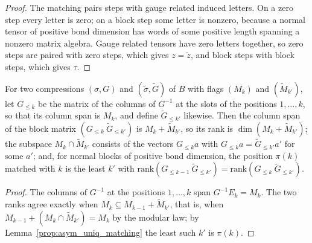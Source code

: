 \begin{proof}
    \leanok
    The matching pairs steps with gauge related induced letters. On a zero step every letter is
    zero; on a block step some letter is nonzero, because a normal tensor of positive bond
    dimension has words of some positive length spanning a nonzero matrix algebra. Gauge related
    tensors have zero letters together, so zero steps are paired with zero steps, which gives
    $z=\widetilde z$, and block steps with block steps, which gives $\tau$.
\end{proof}

\begin{lemma}
    \label{lem:asym_uniq_rank_test}
    \leanok
    For two compressions $(\sigma,G)$ and $(\widetilde\sigma,\widetilde G)$ of $B$ with flags
    $(M_k)$ and $(\widetilde M_{k'})$, let $G_{\leq k}$ be the matrix of the columns of $G^{-1}$ at
    the slots of the positions $1,\ldots,k$, so that its column span is $M_k$, and define
    $\widetilde G_{\leq k'}$ likewise. Then the column span of the block matrix
    $(G_{\leq k}\ \widetilde G_{\leq k'})$ is $M_k+\widetilde M_{k'}$, so its rank is
    $\dim(M_k+\widetilde M_{k'})$; the subspace $M_k\cap\widetilde M_{k'}$ consists of the vectors
    $G_{\leq k}a$ with $G_{\leq k}a=\widetilde G_{\leq k'}a'$ for some $a'$; and, for normal blocks of
    positive bond dimension, the position $\pi(k)$ matched with $k$ is the least $k'$ with
    $\mathrm{rank}(G_{\leq k-1}\ \widetilde G_{\leq k'})=\mathrm{rank}(G_{\leq k}\ \widetilde G_{\leq k'})$.
\end{lemma}

\begin{proof}
    \leanok
    The columns of $G^{-1}$ at the positions $1,\ldots,k$ span $G^{-1}E_k=M_k$. The two ranks agree
    exactly when $M_k\subseteq M_{k-1}+\widetilde M_{k'}$, that is, when
    $M_{k-1}+(M_k\cap\widetilde M_{k'})=M_k$ by the modular law; by
    Lemma~\ref{prop:asym_uniq_matching} the least such $k'$ is $\pi(k)$.
\end{proof}

